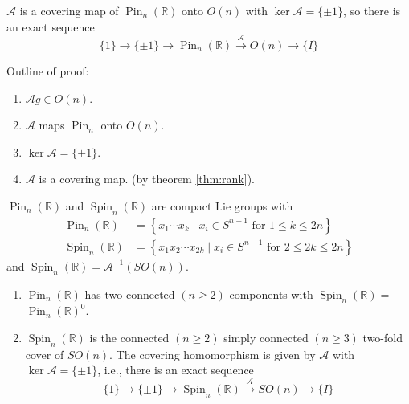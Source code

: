 \documentclass[11pt]{homework}
\begin{document}
\begin{lemma}
    $\mathcal{A}$ is a covering map of $\operatorname{Pin}_{n}(\mathbb{R})$ onto $O(n)$ with $\operatorname{ker} \mathcal{A}=\{\pm 1\}$, so there is an exact sequence
    \begin{equation*}
        \{1\} \rightarrow\{\pm 1\} \rightarrow \operatorname{Pin}_{n}(\mathbb{R}) \stackrel{\mathcal{A}}{\rightarrow} O(n) \rightarrow\{I\}
    \end{equation*}
\end{lemma}

\begin{remark}
    Outline of proof: 
    \begin{enumerate}
        \item $\mathcal{A} g \in O(n)$.
        \item $\mathcal{A}$ maps $\operatorname{Pin}_{n}$ onto $O(n)$.
        \item $\ker \mathcal{A} = \{\pm 1\}$.
        \item $\mathcal{A}$ is a covering map. (by theorem \ref{thm:rank}).
    \end{enumerate}
\end{remark}

\begin{lemma}
    $\operatorname{Pin}_{n}(\mathbb{R})$ and $\operatorname{Spin}_{n}(\mathbb{R})$ are compact I.ie groups with
    \begin{align*}
        \operatorname{Pin}_{n}(\mathbb{R}) &=\left\{x_{1} \cdots x_{k} \mid x_{i} \in S^{n-1} \text { for } 1 \leq k \leq 2 n\right\} \\
        \operatorname{Spin}_{n}(\mathbb{R}) &=\left\{x_{1} x_{2} \cdots x_{2 k} \mid x_{i} \in S^{n-1} \text { for } 2 \leq 2 k \leq 2 n\right\}
    \end{align*}
    and $\operatorname{Spin}_{n}(\mathbb{R})=\mathcal{A}^{-1}(S O(n))$.
\end{lemma}

\begin{theorem}
    \begin{enumerate}
        \item $\operatorname{Pin}_{n}(\mathbb{R})$ has two connected $(n \geq 2)$ components with $\operatorname{Spin}_{n}(\mathbb{R})=$ $\operatorname{Pin}_{n}(\mathbb{R})^{0}$.
        \item $\operatorname{Spin}_{n}(\mathbb{R})$ is the connected $(n \geq 2)$ simply connected $(n \geq 3)$ two-fold cover of $S O(n) .$ The covering homomorphism is given by $\mathcal{A}$ with $\operatorname{ker} \mathcal{A}=\{\pm 1\}$, i.e., there is an exact sequence
        \begin{equation*}
            \{1\} \rightarrow\{\pm 1\} \rightarrow \operatorname{Spin}_{n}(\mathbb{R}) \stackrel{\mathcal{A}}{\rightarrow} S O(n) \rightarrow\{I\}
        \end{equation*}
    \end{enumerate}
\end{theorem}
\end{document}
